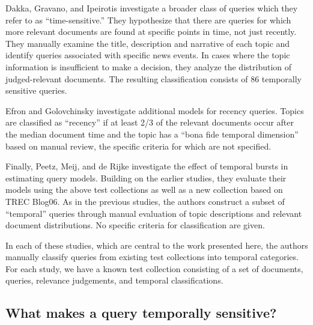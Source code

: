 \documentclass{sig-alternate}
\begin{document}
Dakka, Gravano, and Ipeirotis  \cite{Dakka2012} investigate a broader class of queries which they refer to as ``time-sensitive.'' They hypothesize that there are queries for which more relevant documents are found at specific points in time, not just recently. They manually examine the title, description and narrative of each topic and identify queries associated with specific news events. In cases where the topic information is insufficient to make a decision, they analyze the distribution of judged-relevant documents. The resulting classification consists of 86 temporally sensitive queries. 

Efron and Golovchinsky \cite{Efron2011} investigate additional models for recency queries.  Topics are classified as ``recency'' if at least 2/3 of the relevant documents occur after the median document time and the topic has a ``bona fide temporal dimension'' based on manual review, the specific criteria for which are not specified.  

Finally, Peetz, Meij, and de Rijke \cite{Peetz2013a} investigate the effect of temporal bursts in estimating query models. Building on the earlier studies, they evaluate their models using the above test collections as well as a new collection based on TREC Blog06. As in the previous studies, the authors construct a subset of ``temporal'' queries through manual evaluation of topic descriptions and relevant document distributions. No specific criteria for classification are given.

In each of these studies, which are central to the work presented here, the authors manually classify queries from existing test collections into temporal categories. For each study, we have a known test collection consisting of a set of documents, queries, relevance judgements, and temporal classifications.  


\subsection{What makes a query temporally sensitive?}
\end{document}
